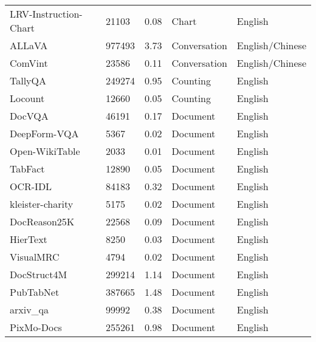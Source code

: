 \begin{table}[h]
\begin{tabular}{l|l|l|l|l}
LRV-Instruction-Chart~\cite{liu2023aligning}           & 21103   & 0.08     & Chart        & English         \\
ALLaVA~\cite{chen2024allava}                          & 977493  & 3.73     & Conversation & English/Chinese \\
ComVint~\cite{du2023makes}                         & 23586   & 0.11     & Conversation & English/Chinese \\
TallyQA~\cite{acharya2019tallyqa}                         & 249274  & 0.95     & Counting     & English         \\
Locount~\cite{Cai2020Locount}                         & 12660   & 0.05     & Counting     & English         \\
DocVQA~\cite{mathew2020docvqa}                          & 46191   & 0.17     & Document     & English         \\
DeepForm-VQA~\cite{aggarwal2023dublin}                    & 5367    & 0.02     & Document     & English         \\
Open-WikiTable~\cite{kweon2023open}                      & 2033    & 0.01     & Document     & English         \\
TabFact~\cite{2019TabFactA}                         & 12890   & 0.05     & Document     & English         \\
OCR-IDL~\cite{biten2022ocr}                         & 84183   & 0.32     & Document     & English         \\
kleister-charity~\cite{stanislawek2021kleister}                & 5175    & 0.02     & Document     & English         \\
DocReason25K~\cite{hu2024docowl}                    & 22568   & 0.09     & Document     & English         \\
HierText~\cite{long2022towards}                        & 8250    & 0.03     & Document     & English         \\
VisualMRC~\cite{VisualMRC2021}                       & 4794    & 0.02     & Document     & English         \\
DocStruct4M~\cite{hu2024docowl}                     & 299214  & 1.14     & Document     & English         \\
PubTabNet~\cite{zhong2019image}                       & 387665  & 1.48     & Document     & English         \\
arxiv\_qa~\cite{li2024multimodalarxiv}                       & 99992   & 0.38     & Document     & English         \\
PixMo-Docs~\cite{deitke2024molmo}                      & 255261  & 0.98     & Document     & English         \\

\end{tabular}
\end{table}
